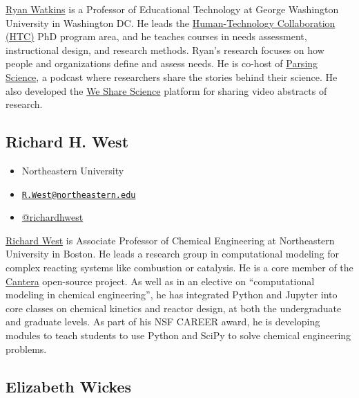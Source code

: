 \documentclass[]{book}
\providecommand{\tightlist}{%
  \setlength{\itemsep}{0pt}\setlength{\parskip}{0pt}}
\begin{document}
\href{https://gsehd.gwu.edu/directory/ryan-watkins}{Ryan Watkins} is a Professor of Educational
Technology at George Washington University in Washington DC. He leads the
\href{https://go.gwu.edu/phd}{Human-Technology Collaboration (HTC)} PhD program area,
and he teaches courses in needs assessment, instructional design, and research methods.
Ryan's research focuses on how people and organizations define and assess needs.
He is co-host of \href{https://parsingscience.org/}{Parsing Science}, a podcast where researchers
share the stories behind their science. He also developed the
\href{https://wesharescience.org/}{We Share Science} platform for sharing video abstracts
of research.

\hypertarget{richard-h.-west}{%
\subsection*{Richard H. West}\label{richard-h.-west}}

\begin{itemize}
\tightlist
\item
  Northeastern University
\item
  \href{mailto:R.West@northeastern.edu}{\nolinkurl{R.West@northeastern.edu}}
\item
  \href{https://twitter.com/richardhwest}{@richardhwest}
\end{itemize}

\href{https://web.northeastern.edu/comocheng/}{Richard West} is Associate Professor of
Chemical Engineering at Northeastern University in Boston. He leads a research group
in computational modeling for complex reacting systems like combustion or catalysis.
He is a core member of the \href{https://cantera.org/}{Cantera} open-source project.
As well as in an elective on ``computational modeling in chemical engineering'',
he has integrated Python and Jupyter into core classes on chemical kinetics and reactor design,
at both the undergraduate and graduate levels. As part of his NSF CAREER award,
he is developing modules to teach students to use Python and SciPy to solve
chemical engineering problems.

\hypertarget{elizabeth-wickes}{%
\subsection*{Elizabeth Wickes}\label{elizabeth-wickes}}
\end{document}
